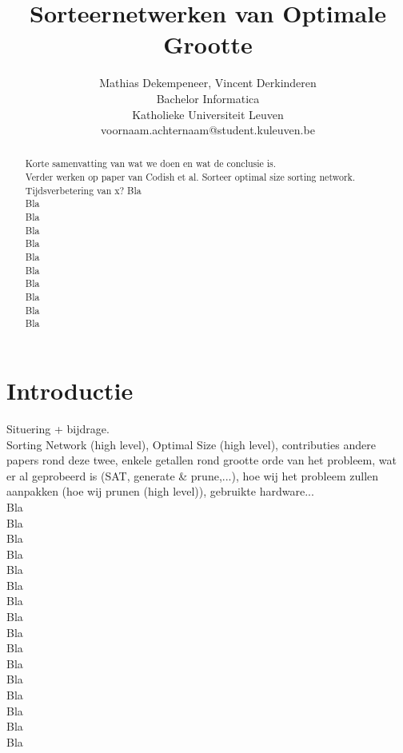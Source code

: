 \documentclass{article}
\title{Sorteernetwerken van Optimale Grootte}%
\author{Mathias Dekempeneer, Vincent Derkinderen \\
Bachelor Informatica\\
Katholieke Universiteit Leuven \\
{voornaam.achternaam}@student.kuleuven.be}
\begin{document}
\maketitle

\begin{abstract}
Korte samenvatting van wat we doen en wat de conclusie is.\\
Verder werken op paper van Codish et al. Sorteer optimal size sorting network.\\
Tijdsverbetering van x?
Bla\\
Bla\\
Bla\\
Bla\\
Bla\\
Bla\\
Bla\\
Bla\\
Bla\\
Bla\\
Bla\\
\end{abstract}

\section{Introductie}

Situering + bijdrage.\\
Sorting Network (high level), Optimal Size (high level), contributies andere papers rond deze twee, enkele getallen rond grootte orde van het probleem, wat er al geprobeerd is (SAT, generate \& prune,...), hoe wij het probleem zullen aanpakken (hoe wij prunen (high level)), gebruikte hardware...\\
Bla\\
Bla\\
Bla\\
Bla\\
Bla\\
Bla\\
Bla\\
Bla\\
Bla\\
Bla\\
Bla\\
Bla\\
Bla\\
Bla\\
Bla\\
Bla\\
\end{document}
